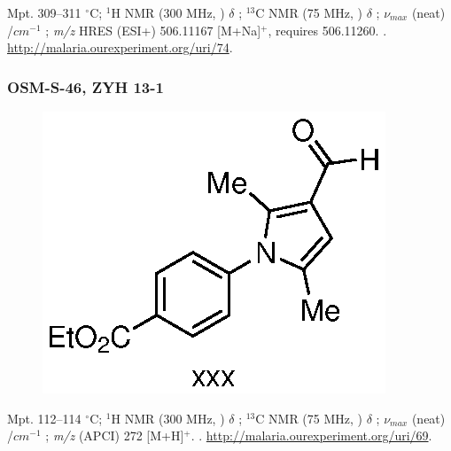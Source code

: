 \documentclass[12pt, a4paper,titlepage]{article}
\begin{document}
{%
Mpt. 309--311 $^\circ$C; 
$^1$H NMR (300 MHz, ) $\delta$ ; 
  $^{13}$C NMR (75 MHz, ) $\delta$ ; 
 $\nu_{max}$ (neat) /$cm^{-1}$ ; 
\emph{m/z} HRES (ESI+) 506.11167 [M+Na]$^+$,  requires 506.11260.
. 
\url{http://malaria.ourexperiment.org/uri/74}.

\subsubsection*{OSM-S-46, ZYH 13-1}
\label{exp:ZYH13}
	\begin{figure}[H]
	\begin{center}
	\includegraphics{exp/ZYH13.eps}
	\end{center}
	\vspace{-25pt}	
	\end{figure}

Mpt. 112--114 $^\circ$C; 
$^1$H NMR (300 MHz, ) $\delta$ ; 
  $^{13}$C NMR (75 MHz, ) $\delta$ ; 
 $\nu_{max}$ (neat) /$cm^{-1}$ ; 
\emph{m/z} (APCI) 272 [M+H]$^+$.
. 
\url{http://malaria.ourexperiment.org/uri/69}. 

}
\end{document}
